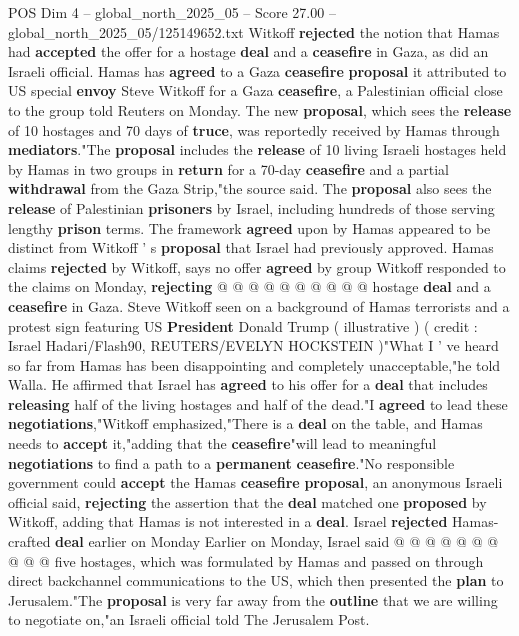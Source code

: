\begin{textsample}{POS Dim 4 – global\_north\_2025\_05 – Score 27.00 – global\_north\_2025\_05/125149652.txt}  \label{ex:f4_pos_211}
Witkoff \textbf{rejected} the notion that Hamas had \textbf{accepted} the offer for a hostage \textbf{deal} and a \textbf{ceasefire} in Gaza, as did an Israeli official.
Hamas has \textbf{agreed} to a Gaza \textbf{ceasefire} \textbf{proposal} it attributed to US special \textbf{envoy} Steve Witkoff for a Gaza \textbf{ceasefire}, a Palestinian official close to the group told Reuters on Monday.
The new \textbf{proposal}, which sees the \textbf{release} of 10 hostages and 70 days of \textbf{truce}, was reportedly received by Hamas through \textbf{mediators}."The \textbf{proposal} includes the \textbf{release} of 10 living Israeli hostages held by Hamas in two groups in \textbf{return} for a 70-day \textbf{ceasefire} and a partial \textbf{withdrawal} from the Gaza Strip,"the source said.
The \textbf{proposal} also sees the \textbf{release} of Palestinian \textbf{prisoners} by Israel, including hundreds of those serving lengthy \textbf{prison} terms.
The framework \textbf{agreed} upon by Hamas appeared to be distinct from Witkoff ' s \textbf{proposal} that Israel had previously approved.
Hamas claims \textbf{rejected} by Witkoff, says no offer \textbf{agreed} by group Witkoff responded to the claims on Monday, \textbf{rejecting} @ @ @ @ @ @ @ @ @ @ hostage \textbf{deal} and a \textbf{ceasefire} in Gaza.
Steve Witkoff seen on a background of Hamas terrorists and a protest sign featuring US \textbf{President} Donald Trump ( illustrative ) ( credit : Israel Hadari/Flash90, REUTERS/EVELYN HOCKSTEIN )"What I ' ve heard so far from Hamas has been disappointing and completely unacceptable,"he told Walla.
He affirmed that Israel has \textbf{agreed} to his offer for a \textbf{deal} that includes \textbf{releasing} half of the living hostages and half of the dead."I \textbf{agreed} to lead these \textbf{negotiations},"Witkoff emphasized,"There is a \textbf{deal} on the table, and Hamas needs to \textbf{accept} it,"adding that the \textbf{ceasefire}"will lead to meaningful \textbf{negotiations} to find a path to a \textbf{permanent} \textbf{ceasefire}."No responsible government could \textbf{accept} the Hamas \textbf{ceasefire} \textbf{proposal}, an anonymous Israeli official said, \textbf{rejecting} the assertion that the \textbf{deal} matched one \textbf{proposed} by Witkoff, adding that Hamas is not interested in a \textbf{deal}.
Israel \textbf{rejected} Hamas-crafted \textbf{deal} earlier on Monday Earlier on Monday, Israel said @ @ @ @ @ @ @ @ @ @ five hostages, which was formulated by Hamas and passed on through direct backchannel communications to the US, which then presented the \textbf{plan} to Jerusalem."The \textbf{proposal} is very far away from the \textbf{outline} that we are willing to negotiate on,"an Israeli official told The Jerusalem Post.

\end{textsample}
